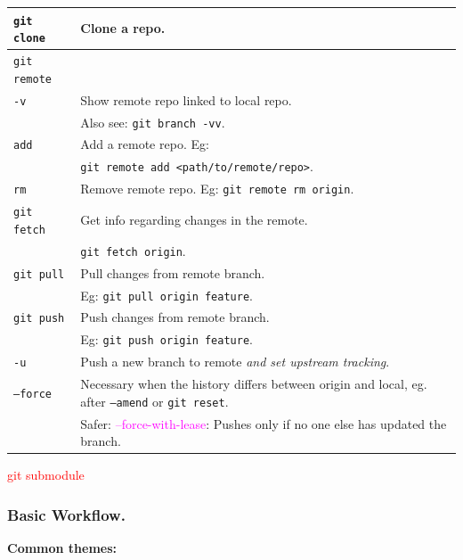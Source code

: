 \begin{tabularx}{\linewidth}{lX}
    \texttt{git clone}      & Clone a repo. \\
    \hline
    \texttt{git remote}     & \\
    \texttt{-v}             & Show remote repo linked to local repo.\\
                            & Also see: \texttt{git branch -vv}.\\
    \texttt{add}            & Add a remote repo. Eg:\\
                            & \texttt{git remote add <path/to/remote/repo>}. \\
    \texttt{rm}             & Remove remote repo. 
                              Eg: \texttt{git remote rm origin}.\\ 
    \hline
    \texttt{git fetch}      & Get info regarding changes in the remote.\\
                            & \texttt{git fetch origin}.\\ 
    \texttt{git pull}       & Pull changes from remote branch.\\
                            & Eg: \texttt{git pull origin feature}.\\
    \hline
    \texttt{git push}       & Push changes from remote branch.\\
                            & Eg: \texttt{git push origin feature}.\\
    \texttt{-u}             & Push a new branch to remote 
                              \textit{and set upstream tracking}.\\
    \texttt{--force}        & Necessary when the history differs between origin
                              and local, eg. after \texttt{--amend} or 
                              \texttt{git reset}.\\
                            & Safer: \textcolor{magenta}{--force-with-lease}:
                                Pushes only if no one else has  updated the 
                                branch.\\
    \hline
\end{tabularx}

\textcolor{red}{git submodule}


\subsubsection*{Basic Workflow.}

\textbf{Common themes:}\\


